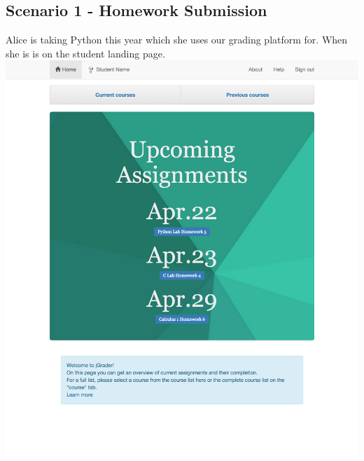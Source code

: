 \subsection{Scenario 1 - Homework Submission}

Alice is taking Python this year which she uses our grading platform for. When she is is on the student landing page.\\
\includegraphics[width=\textwidth]{screenshots/StudentLandingPage.png}\\

